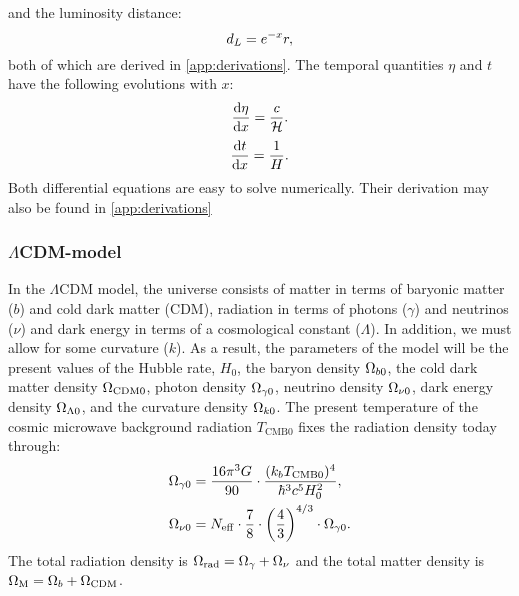     and the luminosity distance:
    \begin{equation}\label{eq:m1:theory:measures:luminosity_distance}
        d_L = e^{-x}r,
    \end{equation}
    both of which are derived in \cref{app:derivations}. The temporal quantities $\eta$ and $t$ have the following evolutions with $x$:
    \begin{equation}\label{eq:m1:theory:measures:eta_diffeq}
        \dv{\eta}{x} = \frac{c}{\mathcal{H}}.
    \end{equation}
    \begin{equation}\label{eq:m1:theory:measures:t_diffeq}
        \dv{t}{x} = \frac{1}{H}.
    \end{equation}
    Both differential equations are easy to solve numerically. Their derivation may also be found in \cref{app:derivations}

\subsubsection{$\Lambda$CDM-model}

    In the $\Lambda$CDM model, the universe consists of matter in terms of baryonic matter ($b$) and cold dark matter (CDM), radiation in terms of photons ($\gamma$) and neutrinos ($\nu$) and dark energy in terms of a cosmological constant ($\Lambda$). In addition, we must allow for some curvature ($k$). As a result, the parameters of the model will be the present values of the Hubble rate, $H_0$, the baryon density $\Omega_{b0}$, the cold dark matter density $\Omega_{\mathrm{CDM}0}$, photon density $\Omega_{\gamma0}$, neutrino density $\Omega_{\nu0}$, dark energy density $\Omega_{\Lambda0}$, and the curvature density $\Omega_{k0}$. The present temperature of the cosmic microwave background radiation $T_{\mathrm{CMB}0}$ fixes the radiation density today through:
    \begin{equation}\label{eq:m1:theory:lambdaCDM:radiation_densities}
        \begin{split}
            \Omega_{\gamma0} &= \frac{16\pi^3G}{90}\cdot\frac{(k_b T_{\mathrm{CMB}0})^4}{\hbar^3c^5H_0^2}, \\
            \Omega_{\nu0} &= N_\mathrm{eff} \cdot\frac{7}{8} \cdot \left( \frac{4}{3} \right)^{4/3}\cdot \Omega_{\gamma0}.
        \end{split}
    \end{equation}
    The total radiation density is $\Omega_\mathrm{rad}=\Omega_\gamma+\Omega_\nu$ and the total matter density is $\Omega_\mathrm{M} = \Omega_b+\Omega_\mathrm{CDM}$.

